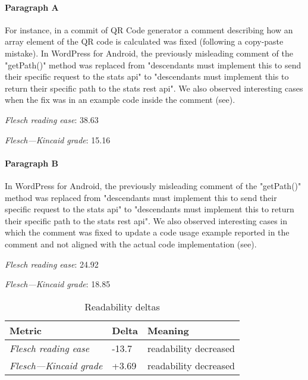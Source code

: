 \paragraph{Paragraph A}
For instance, in a commit of QR Code generator a comment describing how an array element of the QR code is calculated was fixed (following a copy-paste mistake). In WordPress for Android, the previously misleading comment of the "getPath()" method was replaced from "descendants must implement this to send their specific request to the stats api" to "descendants must implement this to return their specific path to the stats rest api". We also observed interesting cases when the fix was in an example code inside the comment (see).\par\medskip
\emph{Flesch reading ease}: 38.63\par
\emph{Flesch---Kincaid grade}: 15.16

\paragraph{Paragraph B}
In WordPress for Android, the previously misleading comment of the "getPath()" method was replaced from "descendants must implement this to send their specific request to the stats api" to "descendants must implement this to return their specific path to the stats rest api". We also observed interesting cases in which the comment was fixed to update a code usage example reported in the comment and not aligned with the actual code implementation (see).\par\medskip
\emph{Flesch reading ease}: 24.92\par
\emph{Flesch---Kincaid grade}: 18.85

\bigskip\begin{table}[!h]
\centering
\begin{tabular}{lll}
\toprule
               \textbf{Metric} & \textbf{Delta} &       \textbf{Meaning} \\
\midrule
    \emph{Flesch reading ease} &          -13.7 &  readability decreased \\
 \emph{Flesch---Kincaid grade} &          +3.69 &  readability decreased \\
\bottomrule
\end{tabular}
\caption*{Readability deltas}\end{table}

